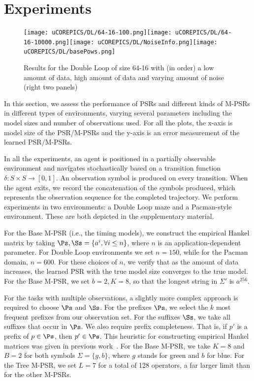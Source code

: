 \section{Experiments}


\begin{figure}[ht!]
\centering
\texttt{[image: uCOREPICS/DL/64-16-100.png]}\texttt{[image: uCOREPICS/DL/64-16-10000.png]}\texttt{[image: uCOREPICS/DL/NoiseInfo.png]}\texttt{[image: uCOREPICS/DL/basePows.png]}

\caption{Results for the Double Loop of size 64-16 with (in order) a low amount of data, high amount of data and varying amount of noise (right two panels)\label{fig-double}}
\end{figure}


In this section, we assess the performance of PSRs and different kinds of M-PSRs in different types of environments, varying several parameters including the model sizes and number of observations used. For all the plots, the x-axis is model size of the PSR/M-PSRs and the y-axis is an error measurement of the learned PSR/M-PSRs.

In all the experiments, an agent is positioned in  a partially observable environment and  navigates  stochastically based on a transition function $\delta:S \times S\rightarrow[0,1]$. An observation symbol is produced on every transition. When the agent exits, we record the concatenation of the symbols produced, which represents the observation sequence for the completed trajectory.  We perform experiments in two environments: a Double Loop maze and a Pacman-style environment. These are both depicted in the supplementary material.


For the Base M-PSR (i.e., the timing models), we construct the empirical Hankel matrix by taking $\Ps, \Ss = \{a^i, \forall i \leq n\}$, where $n$ is an application-dependent parameter. For Double Loop environments we set $n = 150$, while for the Pacman domain, $n = 600$. For these choices of $n$, we verify that as the amount of data increases, the learned PSR with the true model size converges to the true model. For the Base M-PSR, we set $b=2, K=8$, so that the longest string in $\Sigma'$ is $a^{256}$.

For the tasks with multiple observations, a slightly more complex approach is required to choose $\Ps$ and $\Ss$. For the prefixes $\Ps$, we select the $k$ most frequent prefixes from our observation set. For the suffixes $\Ss$, we take all suffixes that occur in $\Ps$. We also require prefix completeness. That is, if $p'$ is a prefix of $p \in \Ps$, then $p' \in \Ps$. This heuristic for constructing empirical Hankel matrices was given in previous work~\cite{icml12}. For the Base M-PSR, we take $K=8$ and $B=2$ for both symbols $\Sigma=\{g,b\}$, where $g$ stands for green and $b$ for blue. For the Tree M-PSR, we set $L=7$ for a total of 128 operators, a far larger limit  than for the other M-PSRs. 

